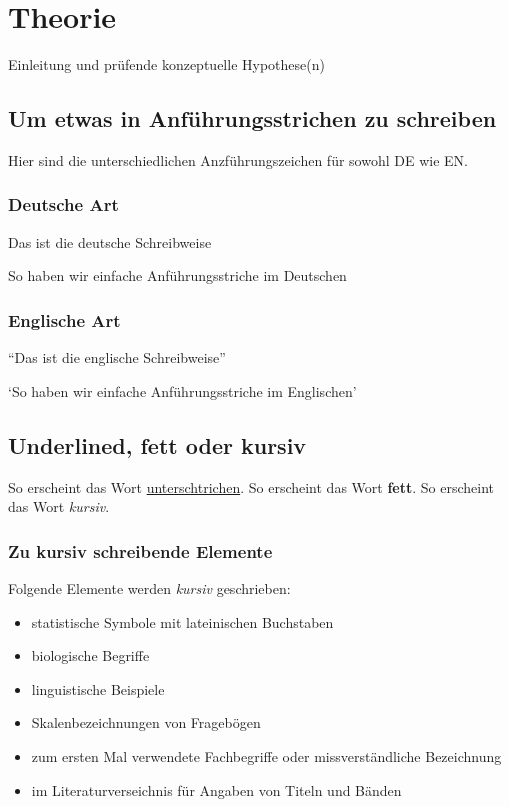 
\chapter{Theorie}   \label{ch_1}
Einleitung und prüfende konzeptuelle Hypothese(n)

\section{Um etwas in Anführungsstrichen zu schreiben}    \label{sec_1.1}
Hier sind die unterschiedlichen Anzführungszeichen für sowohl DE wie EN.

\subsection{Deutsche Art}    \label{subsubsec_1.1.1}
\glqq Das ist die deutsche Schreibweise\grqq

\glq So haben wir einfache Anführungsstriche im Deutschen\grq

\subsection{Englische Art}   \label{subsubsec_1.1.2}
``Das ist die englische Schreibweise''

`So haben wir einfache Anführungsstriche im Englischen'



\section{Underlined, fett oder kursiv}   \label{subsec_1.2}
So erscheint das Wort \underline{unterschtrichen}.
So erscheint das Wort \textbf{fett}.
So erscheint das Wort \textit{kursiv}.

\subsection{Zu kursiv schreibende Elemente}  \label{subsubsec_1.2.1}
Folgende Elemente werden \textit{kursiv} geschrieben:
\begin{itemize}[leftmargin=1.25cm]
    \item statistische Symbole mit lateinischen Buchstaben
    \item biologische Begriffe
    \item linguistische Beispiele
    \item Skalenbezeichnungen von Fragebögen
    \item zum ersten Mal verwendete Fachbegriffe oder missverständliche Bezeichnung
    \item im Literaturverseichnis für Angaben von Titeln und Bänden
\end{itemize}
